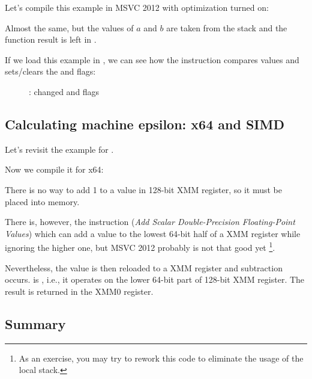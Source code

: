 Let's compile this example in MSVC 2012 with optimization turned on:



Almost the same, but the values of $a$ and $b$ are taken from the stack and the function result 
is left in .

If we load this example in \olly, 
we can see how the  instruction compares values and sets/clears the \CF and \PF flags:

\begin{figure}[H]
\centering
{}
\caption{\olly:  changed \CF and \PF flags}
\label{fig:FPU_SIMD_d_max_olly}
\end{figure}

\subsection{Calculating machine epsilon: x64 and SIMD}
\label{machine_epsilon_x64_and_SIMD}

Let's revisit the  example for \Tdouble {}.

Now we compile it for x64:



There is no way to add 1 to a value in 128-bit XMM register, so it must be placed into memory.

There is, however, the  instruction (\emph{Add Scalar Double-Precision Floating-Point Values}) 
which can add a value to the lowest 64-bit half of a XMM register while ignoring the higher one, 
but MSVC 2012 probably is not that good yet
\footnote{As an exercise, you may try to rework this code to 
eliminate the usage of the local stack.}.

Nevertheless, the value is then reloaded to a XMM register and subtraction occurs.
 is , 
i.e., it operates on the lower 64-bit part of 128-bit XMM register.
The result is returned in the XMM0 register.



\subsection{Summary}


